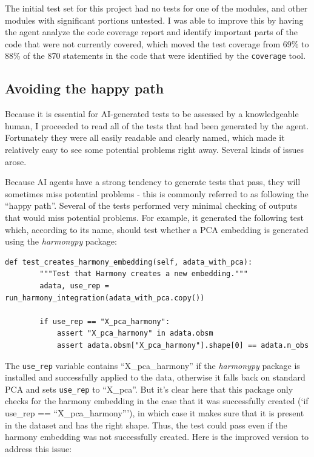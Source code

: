 The initial test set for this project had no tests for one of the modules, and other modules with significant portions untested.  I was able to improve this by having the agent analyze the code coverage report and identify important parts of the code that were not currently covered, which moved the test coverage from 69\% to 88\% of the 870 statements in the code that were identified by the \texttt{coverage} tool.

\subsection{Avoiding the happy path}

Because it is essential for AI-generated tests to be assessed by a knowledgeable human, I proceeded to read all of the tests that had been generated by the agent.  Fortunately they were all easily readable and clearly named, which made it relatively easy to see some potential problems right away. Several kinds of issues arose.

Because AI agents have a strong tendency to generate tests that pass, they will sometimes miss potential problems - this is commonly referred to as following the ``happy path''. Several of the tests performed very minimal checking of outputs that would miss potential problems.  For example, it generated the following test which, according to its name, should test whether a PCA embedding is generated using the \textit{harmonypy} package:

\begin{lstlisting}[style=Python]
def test_creates_harmony_embedding(self, adata_with_pca):
        """Test that Harmony creates a new embedding."""
        adata, use_rep = run_harmony_integration(adata_with_pca.copy())

        if use_rep == "X_pca_harmony":
            assert "X_pca_harmony" in adata.obsm
            assert adata.obsm["X_pca_harmony"].shape[0] == adata.n_obs
\end{lstlisting}

The \texttt{use\_rep} variable contains ``X\_pca\_harmony'' if the \textit{harmonypy} package is installed and successfully applied to the data, otherwise it falls back on standard PCA and sets \texttt{use\_rep} to ``X\_pca''.  But it's clear here that this package only checks for the harmony embedding in the case that it was successfully created (`if use\_rep == ``X\_pca\_harmony'''), in which case it makes sure that it is present in the dataset and has the right shape. Thus, the test could pass even if the harmony embedding was not successfully created.  Here is the improved version to address this issue:

